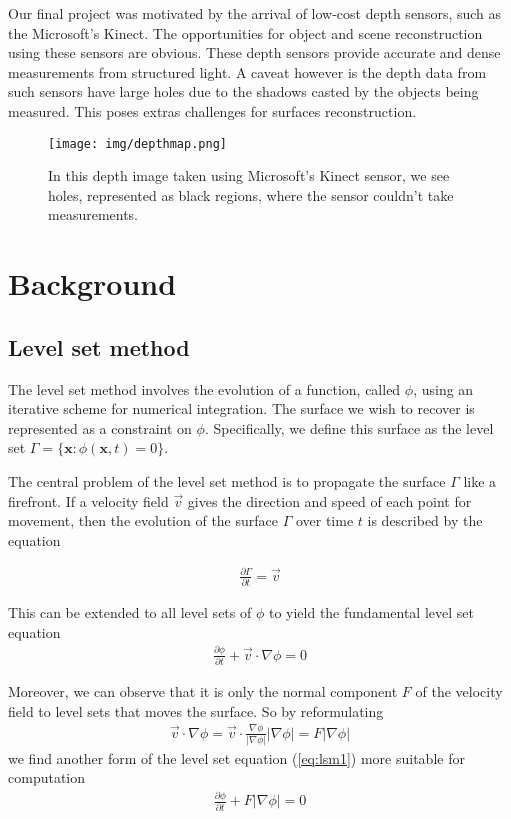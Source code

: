 \documentclass{article}
\begin{document}
Our final project was motivated by the arrival of low-cost depth sensors, such
as the Microsoft's Kinect. The opportunities for object and scene
reconstruction using these sensors are obvious. These depth sensors provide
accurate and dense measurements from structured light. A caveat however is the
depth data from such sensors have large holes due to the shadows casted by the
objects being measured. This poses extras challenges for surfaces
reconstruction.

\begin{figure}
  \centering
  \texttt{[image: img/depthmap.png]}
  \caption{In this depth image taken using Microsoft's Kinect sensor, we see
holes, represented as black regions, where the sensor couldn't take
measurements.}

\end{figure}

\section{Background}
\subsection{Level set method}
\label{sec:lsm}
The level set method involves the evolution of a function, called $\phi$,
using an iterative scheme for numerical integration. The surface we wish to
recover is represented as a constraint on $\phi$. Specifically, we define this
surface as the level set $\Gamma=\{\mathbf{x}:\phi(\mathbf{x}, t)=0\}$.

The central problem of the level set method is to propagate the surface
$\Gamma$ like a firefront. If a velocity field $\vec{v}$ gives the direction
and speed of each point for movement, then the evolution of the surface
$\Gamma$ over time $t$ is described by the equation

\begin{align}
  \frac{\partial \Gamma}{\partial t} = \vec{v}
\end{align}

This can be extended to all level sets of $\phi$ to yield the fundamental
level set equation
\begin{align}
  \frac{\partial \phi}{\partial t} + \vec{v} \cdot \nabla \phi = 0
  \label{eq:lsm1}
\end{align}

Moreover, we can observe that it is only the normal component $F$ of the
velocity field to level sets that moves the surface. So by reformulating
\begin{align}
  \vec{v} \cdot \nabla \phi
  = \vec{v} \cdot \frac{\nabla \phi}{|\nabla \phi|}|\nabla \phi| 
  = F|\nabla \phi|
\end{align}
we find another form of the level set equation (\ref{eq:lsm1}) more suitable
for computation
\begin{align}
  \frac{\partial \phi}{\partial t} + F|\nabla \phi| = 0
\end{align}
\end{document}

